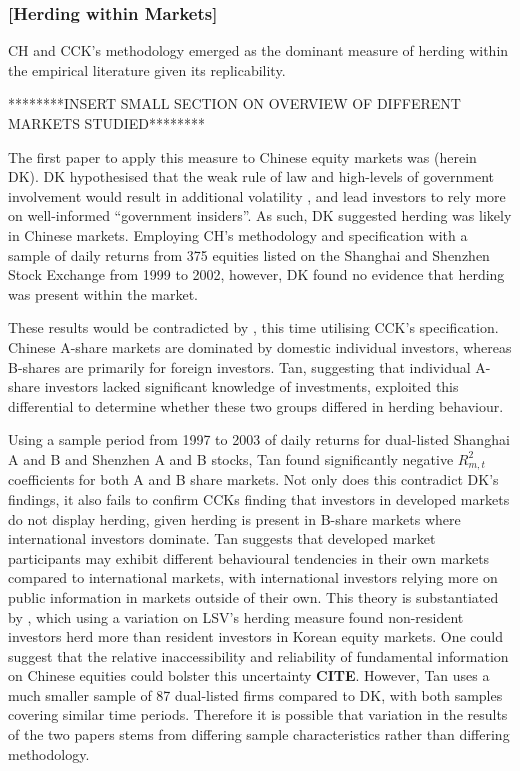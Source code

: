 \documentclass[12pt]{article}
\numberwithin{table}{section}   %
\begin{document}
\subsubsection*{[Herding within Markets]} 

CH and CCK’s methodology emerged as the dominant measure of herding within the empirical literature given its replicability.

********INSERT SMALL SECTION ON OVERVIEW OF DIFFERENT MARKETS STUDIED********

The first paper to apply this measure to Chinese equity markets was \citet{dk} (herein DK). DK hypothesised that the weak rule of law and high-levels of government involvement would result in additional volatility \citep{su}, and lead investors to rely more on well-informed “government insiders”. As such, DK suggested herding was likely in Chinese markets. Employing CH’s methodology and specification with a sample of daily returns from 375 equities listed on the Shanghai and Shenzhen Stock Exchange from 1999 to 2002, however, DK found no evidence that herding was present within the market.

These results would be contradicted by \citet{tan}, this time utilising CCK’s specification. Chinese A-share markets are dominated by domestic individual investors, whereas B-shares are primarily for foreign investors. Tan, suggesting that individual A-share investors lacked significant knowledge of investments, exploited this differential to determine whether these two groups differed in herding behaviour.

Using a sample period from 1997 to 2003 of daily returns for dual-listed Shanghai A and B and Shenzhen A and B stocks, Tan found significantly negative $R_{m,t}^2$ coefficients for both A and B share markets. Not only does this contradict DK’s findings, it also fails to confirm CCKs finding that investors in developed markets do not display herding, given herding is present in B-share markets where international investors dominate. Tan suggests that developed market participants may exhibit different behavioural tendencies in their own markets compared to international markets, with international investors relying more on public information in markets outside of their own. This theory is substantiated by \citet{kim}, which using a variation on LSV’s herding measure found non-resident investors herd more than resident investors in Korean equity markets. One could suggest that the relative inaccessibility and reliability of fundamental information on Chinese equities could bolster this uncertainty \textbf{CITE}. However, Tan uses a much smaller sample of 87 dual-listed firms compared to DK, with both samples covering similar time periods. Therefore it is possible that variation in the results of the two papers stems from differing sample characteristics rather than differing methodology.
\end{document}
